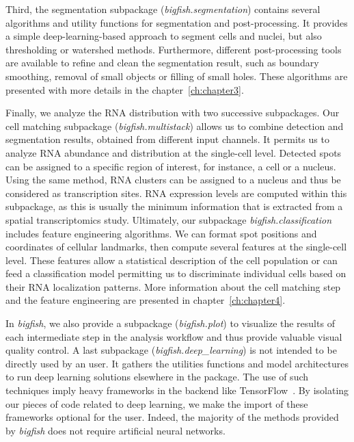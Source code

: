 Third, the segmentation subpackage (\emph{bigfish.segmentation}) contains several algorithms and utility functions for segmentation and post-processing.
It provides a simple deep-learning-based approach to segment cells and nuclei, but also thresholding or watershed methods.
Furthermore, different post-processing tools are available to refine and clean the segmentation result, such as boundary smoothing, removal of small objects or filling of small holes.
These algorithms are presented with more details in the chapter~\ref{ch:chapter3}.

Finally, we analyze the \ac{RNA} distribution with two successive subpackages.
Our cell matching subpackage (\emph{bigfish.multistack}) allows us to combine detection and segmentation results, obtained from different input channels.
It permits us to analyze \ac{RNA} abundance and distribution at the single-cell level.
Detected spots can be assigned to a specific region of interest, for instance, a cell or a nucleus.
Using the same method, \ac{RNA} clusters can be assigned to a nucleus and thus be considered as transcription sites.
\ac{RNA} expression levels are computed within this subpackage, as this is usually the minimum information that is extracted from a spatial transcriptomics study.
Ultimately, our subpackage \emph{bigfish.classification} includes feature engineering algorithms.
We can format spot positions and coordinates of cellular landmarks, then compute several features at the single-cell level.
These features allow a statistical description of the cell population or can feed a classification model permitting us to discriminate individual cells based on their RNA localization patterns.
More information about the cell matching step and the feature engineering are presented in chapter~\ref{ch:chapter4}.

In \emph{bigfish}, we also provide a subpackage (\emph{bigfish.plot}) to visualize the results of each intermediate step in the analysis workflow and thus provide valuable visual quality control.
A last subpackage (\emph{bigfish.deep\_learning}) is not intended to be directly used by an user.
It gathers the utilities functions and model architectures to run deep learning solutions elsewhere in the package.
The use of such techniques imply heavy frameworks in the backend like TensorFlow~\cite{tensorflow_2015}.
By isolating our pieces of code related to deep learning, we make the import of these frameworks optional for the user.
Indeed, the majority of the methods provided by \emph{bigfish} does not require artificial neural networks.

